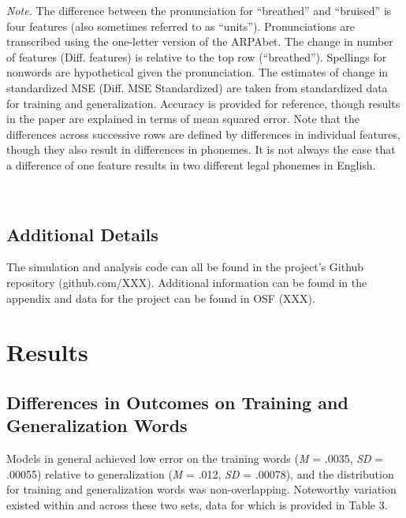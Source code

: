 \documentclass[
  ,man,floatsintext]{apa6}
\begin{document}
\emph{Note.} The difference between the pronunciation for ``breathed'' and ``bruised'' is four features (also sometimes referred to as ``units''). Pronunciations are transcribed using the one-letter version of the ARPAbet. The change in number of features (Diff. features) is relative to the top row (``breathed''). Spellings for nonwords are hypothetical given the pronunciation. The estimates of change in standardized MSE (Diff. MSE Standardized) are taken from standardized data for training and generalization. Accuracy is provided for reference, though results in the paper are explained in terms of mean squared error. Note that the differences across successive rows are defined by differences in individual features, though they also result in differences in phonemes. It is not always the case that a difference of one feature results in two different legal phonemes in English.

~

\hypertarget{additional-details}{%
\subsection{Additional Details}\label{additional-details}}

The simulation and analysis code can all be found in the project's Github repository (github.com/XXX). Additional information can be found in the appendix and data for the project can be found in OSF (XXX).

\hypertarget{results}{%
\section{Results}\label{results}}

\hypertarget{differences-in-outcomes-on-training-and-generalization-words}{%
\subsection{Differences in Outcomes on Training and Generalization Words}\label{differences-in-outcomes-on-training-and-generalization-words}}

Models in general achieved low error on the training words (\emph{M} = .0035, \emph{SD} = .00055) relative to generalization (\emph{M} = .012, \emph{SD} = .00078), and the distribution for training and generalization words was non-overlapping. Noteworthy variation existed within and across these two sets, data for which is provided in Table 3.
\end{document}
